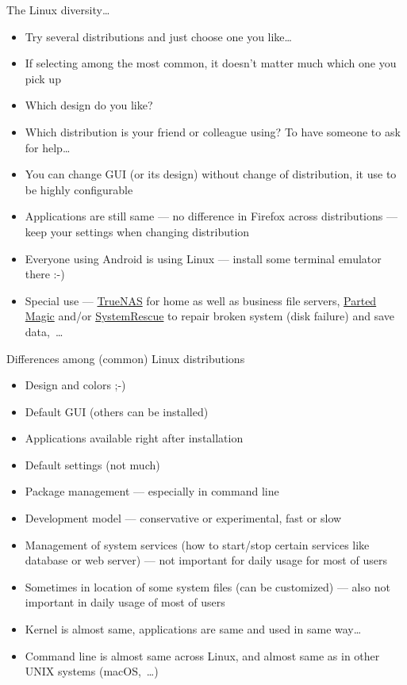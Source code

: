\documentclass[compress, xelatex, 11pt, xcolor=svgnames, aspectratio=169, url={hyphens, lowtilde}]{beamer}
\begin{document}
\begin{frame}{The Linux diversity\ldots}
	\begin{itemize}
		\item Try several distributions and just choose one you like\ldots
		\item If selecting among the most common, it doesn't matter much which one you pick up
		\item Which design do you like?
		\item Which distribution is your friend or colleague using? To have someone to ask for help\ldots
		\item You can change GUI (or its design) without change of distribution, it use to be highly configurable
		\item Applications are still same --- no difference in Firefox across distributions --- keep your settings when changing distribution
		\item Everyone using Android is using Linux --- install some terminal emulator there :-)
		\item Special use --- \href{https://www.truenas.com/}{TrueNAS} for home as well as business file servers, \href{https://partedmagic.com/}{Parted Magic} and/or \href{https://www.system-rescue.org/}{SystemRescue} to repair broken system (disk failure) and save data,~\ldots
	\end{itemize}
\end{frame}

\begin{frame}{Differences among (common) Linux distributions}
	\begin{itemize}
		\item Design and colors ;-)
		\item Default GUI (others can be installed)
		\item Applications available right after installation
		\item Default settings (not much)
		\item Package management --- especially in command line
		\item Development model --- conservative or experimental, fast or slow
		\item Management of system services (how to start/stop certain services like database or web server) --- not important for daily usage for most of users
		\item Sometimes in location of some system files (can be customized) --- also not important in daily usage of most of users
		\item Kernel is almost same, applications are same and used in same way\ldots
		\item Command line is almost same across Linux, and almost same as in other UNIX systems (macOS,~\ldots)
	\end{itemize}
\end{frame}
\end{document}
